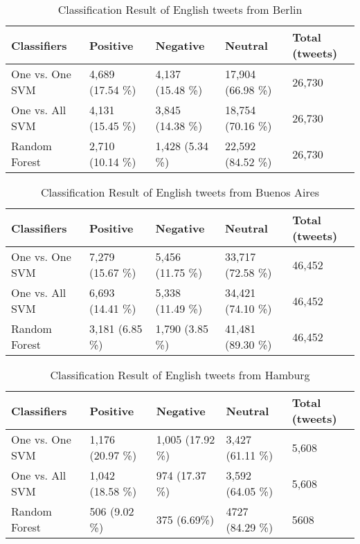 \begin{table}[ht]
	\caption{Classification Result of English tweets from Berlin}
	\begin{tabular}{|l|p{1.8cm}|p{1.8cm}|p{1.8cm}|p{1.8cm}|} \hline
	Classifiers & Positive & Negative & Neutral & Total (tweets)\\ \hline
One vs. One SVM & 4,689 (17.54 \%) & 4,137 (15.48 \%)  & 17,904 (66.98 \%)& 26,730 \\ \hline
One vs. All SVM & 4,131 (15.45 \%) & 3,845 (14.38 \%) & 18,754 (70.16 \%) & 26,730 \\ \hline
Random Forest   & 2,710 (10.14 \%) & 1,428 (5.34 \%) & 22,592 (84.52 \%) & 26,730 \\ \hline
	\end{tabular}
	\label{tab:result_berlin_en}
\end{table}


\begin{table}[ht]
	\caption{Classification Result of English tweets from Buenos Aires}
	\begin{tabular}{|l|p{1.8cm}|p{1.8cm}|p{1.8cm}|p{1.8cm}|} \hline
	Classifiers & Positive & Negative & Neutral & Total (tweets)\\ \hline
One vs. One SVM & 7,279 (15.67 \%) & 5,456 (11.75 \%) & 33,717 (72.58 \%) & 46,452 \\ \hline
One vs. All SVM & 6,693 (14.41 \%) & 5,338 (11.49 \%) & 34,421 (74.10 \%) & 46,452 \\\hline
Random Forest   & 3,181 (6.85 \%) & 1,790 (3.85 \%) & 41,481 (89.30 \%) & 46,452 \\\hline
	\end{tabular}
	\label{tab:result_buenosaires_en}
\end{table}



\begin{table}[ht]
	\caption{Classification Result of English tweets from Hamburg}
	\begin{tabular}{|l|p{1.8cm}|p{1.8cm}|p{1.8cm}|p{1.8cm}|} \hline
	Classifiers & Positive & Negative & Neutral & Total (tweets)\\ \hline
One vs. One SVM & 1,176 (20.97 \%) & 1,005 (17.92 \%) & 3,427 (61.11 \%) & 5,608 \\\hline
One vs. All SVM & 1,042 (18.58 \%) & 974 (17.37 \%) & 3,592 (64.05 \%) & 5,608 \\\hline
Random Forest   & 506 (9.02 \%)  & 375 (6.69\%) & 4727 (84.29 \%) & 5608 \\\hline
	\end{tabular}
	\label{tab:result_hamburg_en}
\end{table}

